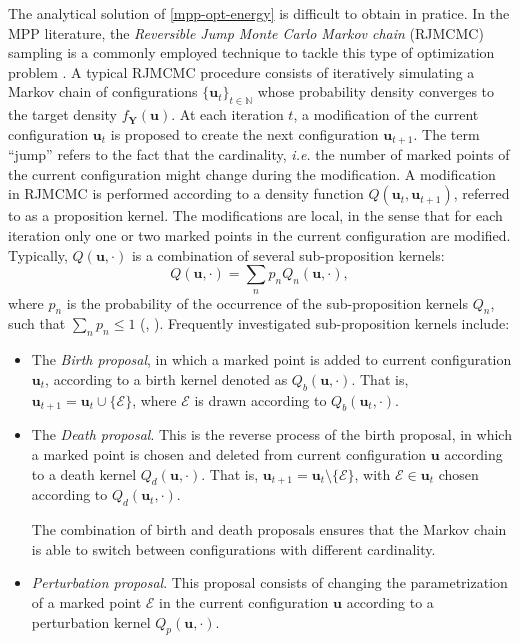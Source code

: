 \documentclass[journal]{IEEEtran}
\begin{document}
The analytical solution of \eqref{mpp-opt-energy} is difficult to
obtain in pratice. In the MPP literature, the \textit{Reversible Jump
  Monte Carlo Markov chain} (RJMCMC) sampling is a commonly employed
technique to tackle this type of optimization problem
\cite{descombes2013stochastic}. A typical RJMCMC procedure consists of
iteratively simulating a Markov chain of configurations
$\{ \mathbf{u}_t \}_{t \in \mathbb{N}}$ whose probability density
converges to the target density $f_{\mathbf{Y}}(\mathbf{u})$. At each
iteration $t$, a modification of the current configuration
$\mathbf{u}_t$ is proposed to create the next configuration
$\mathbf{u}_{t+1}$. The term ``jump'' refers to the fact that the
cardinality, \textit{i.e.} the number of marked points of the current
configuration might change during the modification. A modification in
RJMCMC is performed according to a density function
$Q(\mathbf{u}_t, \mathbf{u}_{t+1})$, referred to as a proposition
kernel. The modifications are local, in the sense that for each
iteration only one or two marked points in the current configuration
are modified. Typically, $Q(\mathbf{u}, \cdot)$ is a combination of
several sub-proposition kernels:
\begin{equation}
  \label{eq:sub-kernels}
  Q(\mathbf{u}, \cdot) = \sum_n p_n Q_n (\mathbf{u}, \cdot),
\end{equation}
where $p_n$ is the probability of the occurrence of the
sub-proposition kernels $Q_n$, such that $\sum_n p_n \le 1$
(\cite{descombes2013stochastic},
\cite{verdie2014detecting}). Frequently investigated sub-proposition
kernels include:

\begin{itemize}

\item The \textit{Birth proposal}, in which a marked point is added to
  current configuration $\mathbf{u}_t$, according to a birth kernel
  denoted as $Q_{b}(\mathbf{u}, \cdot)$. That is,
  $\mathbf{u}_{t+1} = \mathbf{u}_t \cup \{\mathcal{E}\}$, where
  $\mathcal{E}$ is drawn according to $Q_{b}(\mathbf{u}_t, \cdot)$.

\item The \textit{Death proposal}. This is the reverse process of the
  birth proposal, in which a marked point is chosen and deleted from
  current configuration $\mathbf{u}$ according to a death kernel
  $Q_{d}(\mathbf{u}, \cdot)$. That is,
  $\mathbf{u}_{t+1} = \mathbf{u}_t \setminus \{\mathcal{E}\}$, with
  $\mathcal{E} \in \mathbf{u}_t$ chosen according to
  $Q_{d}(\mathbf{u}_t, \cdot)$.

  The combination of birth and death proposals ensures that the Markov
  chain is able to switch between configurations with different
  cardinality.

\item \textit{Perturbation proposal}. This proposal consists of
  changing the parametrization of a marked point $\mathcal{E}$ in the
  current configuration $\mathbf{u}$ according to a perturbation
  kernel $Q_{p}(\mathbf{u}, \cdot)$.

\end{itemize}
\end{document}
